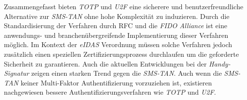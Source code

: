 \documentclass[11pt,a4paper,ngerman]{scrreprt}
\begin{document}
Zusammengefasst bieten \textit{TOTP} und \textit{U2F} eine sicherere und benutzerfreundliche Alternative zur \textit{SMS-TAN} ohne hohe Komplexität zu induzieren. Durch die Standardisierung der Verfahren durch RFC und die \textit{FIDO Alliance} ist eine anwendungs- und branchenübergreifende Implementierung dieser Verfahren möglich. Im Kontext der \textit{eIDAS} Verordnung müssen solche Verfahren jedoch zusätzlich einen speziellen Zertifizierungsprozess durchlaufen um die geforderte Sicherheit zu garantieren. Auch die aktuellen Entwicklungen bei der \textit{Handy-Signatur} zeigen einen starken Trend gegen die \textit{SMS-TAN}. Auch wenn die \textit{SMS-TAN} keiner Multi-Faktor Authentifizierung vorzuziehen ist, existieren nachgewiesen bessere Authentifizierungsverfahren wie \textit{TOTP} und \textit{U2F}.

\clearpage

\end{document}
